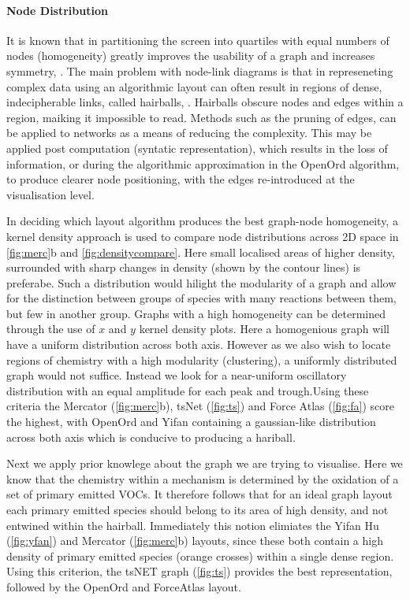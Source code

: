 \paragraph{Node Distribution}\label{sec:nodedist}

It is known that in partitioning the screen into quartiles with equal numbers of nodes (homogeneity) greatly improves the usability of a graph and increases symmetry, \cite{ch6graphredability}. The main problem with node-link diagrams is that in represeneting complex data using an algorithmic layout can often result in regions of dense, indecipherable links, called hairballs, \cite{vislarge}. Hairballs obscure nodes and edges within a region, maiking it impossible to read. Methods such as the pruning of edges, \cite{edgeprune} can be applied to networks as a means of reducing the complexity. This may be applied post computation (syntatic representation), which results in the loss of information, or during the algorithmic approximation in the OpenOrd algorithm, to produce clearer node positioning, with the edges re-introduced at the visualisation level. 

In deciding which layout algorithm produces the best graph-node homogeneity, a kernel density approach is used to compare node distributions across 2D space in \autoref{fig:merc}b and \autoref{fig:densitycompare}. 
Here small localised areas of higher density, surrounded with sharp changes in density (shown by the contour lines) is preferabe. Such a distribution would hilight the modularity of a graph and allow for the distinction between groups of species with many reactions between them, but few in another group. Graphs with a high homogeneity can be determined through the use of $x$ and $y$ kernel density plots. Here a homogenious graph will have a uniform distribution across both axis. However as we also wish to locate regions of chemistry with a high modularity (clustering), a uniformly distributed graph would not suffice. Instead we look for a near-uniform oscillatory distribution with an equal amplitude for each peak and trough.Using these criteria the Mercator (\autoref{fig:merc}b), tsNet (\autoref{fig:ts}) and Force Atlas (\autoref{fig:fa}) score the highest, with OpenOrd and Yifan containing a gaussian-like distribution across both axis which is conducive to producing a hariball. 

Next we apply prior knowlege about the graph we are trying to visualise. Here we know that the chemistry within a mechanism is determined by the oxidation of a set of primary emitted VOCs. It therefore follows that for an ideal graph layout each primary emitted species should belong to its area of high density, and not entwined within the hairball. Immediately this notion elimiates the Yifan Hu (\autoref{fig:yfan}) and Mercator (\autoref{fig:merc}b) layouts, since these both contain a high density of primary emitted species (orange crosses) within a single dense region. Using this criterion, the tsNET graph (\autoref{fig:ts}) provides the best representation, followed by the OpenOrd and ForceAtlas layout. 


